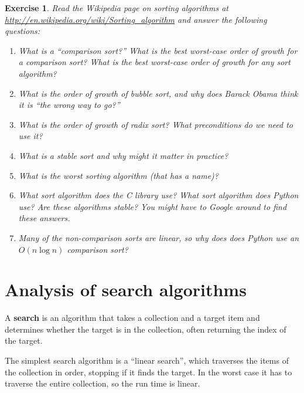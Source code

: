 \documentclass[12pt]{book}
\theoremstyle{exercise}
\newtheorem{exercise}{Exercise}[chapter]
\begin{document}
\begin{exercise}

Read the Wikipedia page on sorting algorithms at
\url{http://en.wikipedia.org/wiki/Sorting_algorithm} and answer
the following questions:

\begin{enumerate}

\item What is a ``comparison sort?'' What is the best worst-case order
  of growth for a comparison sort?  What is the best worst-case order
  of growth for any sort algorithm?

\item What is the order of growth of bubble sort, and why does Barack
  Obama think it is ``the wrong way to go?''

\item What is the order of growth of radix sort?  What preconditions
  do we need to use it?

\item What is a stable sort and why might it matter in practice?

\item What is the worst sorting algorithm (that has a name)?

\item What sort algorithm does the C library use?  What sort algorithm
  does Python use?  Are these algorithms stable?  You might have to
  Google around to find these answers.

\item Many of the non-comparison sorts are linear, so why does does
  Python use an $O(n \log n)$ comparison sort?

\end{enumerate}

\end{exercise}


\section{Analysis of search algorithms}

A {\bf search} is an algorithm that takes a collection and a target
item and determines whether the target is in the collection, often
returning the index of the target.

The simplest search algorithm is a ``linear search'', which traverses
the items of the collection in order, stopping if it finds the target.
In the worst case it has to traverse the entire collection, so the run
time is linear.
\end{document}
